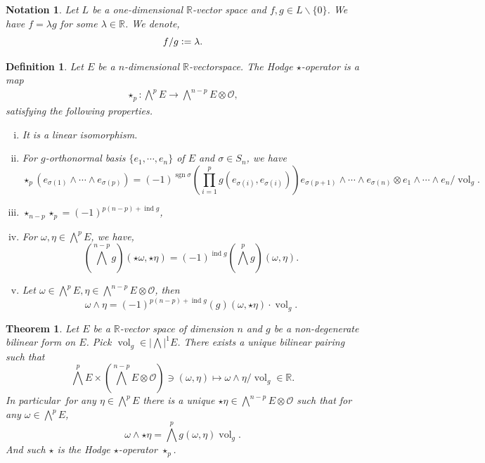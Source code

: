 \documentclass[10pt]{article}
\newtheorem{theorem}{Theorem} [section]
\newtheorem{definition}{Definition}[section]
\newtheorem{notation}{Notation}[section]
\DeclareMathOperator{\ind}{ind}
\DeclareMathOperator{\sgn}{sgn}
\DeclareMathOperator{\vol}{vol}
\newcommand{\defeq}{\vcentcolon=}
\newcommand{\R}[0]{\mathbb{R}}
\begin{document}
\begin{notation}
  Let $L$ be a one-dimensional $\R$-vector space and $f,g\in L\backslash\{0\}$. We have $f = \lambda g$ for some $\lambda\in\R$. We denote,
  \begin{equation*}
    f/g \defeq \lambda.
  \end{equation*}
\end{notation}

\begin{definition}
  Let $E$ be a $n$-dimensional $\R$-vectorspace. The Hodge $\star$-operator is a map 
  \begin{align*}
    \star_p:\bigwedge^p E\to\bigwedge^{n-p}E\otimes \mathcal{O},
  \end{align*}
  satisfying the following properties.
  \begin{enumerate}[i).]
    \item It is a linear isomorphism.
    \item For $g$-orthonormal basis $\{e_1,\cdots,e_n\}$ of $E$ and $\sigma\in S_n$, we have 
    \begin{equation*}
      \star_p (e_{\sigma(1)}\wedge\cdots\wedge e_{\sigma(p)}) = (-1)^{\sgn\sigma}\left(\prod_{i=1}^pg(e_{\sigma(i)},e_{\sigma(i)})\right)e_{\sigma(p+1)}\wedge\cdots\wedge e_{\sigma(n)}\otimes e_1\wedge\cdots\wedge e_n/\vol_g.
    \end{equation*}
    \item $\star_{n-p}\star_p = (-1)^{p(n-p)+\ind g}$,
    \item For $\omega,\eta\in\bigwedge^p E$, we have,
    \begin{equation*}
      \left(\bigwedge^{n-p}g\right)(\star\omega,\star\eta) = (-1)^{\ind g}\left(\bigwedge^p g\right)(\omega,\eta).
    \end{equation*}
    \item Let $\omega\in\bigwedge^pE,\eta\in\bigwedge^{n-p}E\otimes\mathcal{O}$, then 
    \begin{equation*}
      \omega\wedge\eta = (-1)^{p(n-p)+\ind g}\left(g\right)(\omega,\star\eta)\cdot\vol_g.
    \end{equation*}
  \end{enumerate}
\end{definition}

\begin{theorem}
  Let $E$ be a $\R$-vector space of dimension $n$ and $g$ be a non-degenerate bilinear form on $E$. Pick $\vol_g\in \left\vert\bigwedge\right\vert^1E$.
  There exists a unique bilinear pairing such that 
  \begin{equation*}
    \bigwedge^p E\times\left(\bigwedge^{n-p}E\otimes \mathcal{O}\right)\ni(\omega,\eta)\mapsto \omega\wedge\eta/\vol_g \in\R.
  \end{equation*}
  In particular\, for any $\eta\in\bigwedge^p E$ there is a unique $\star\eta\in\bigwedge^{n-p}E\otimes \mathcal{O}$ such that for any $\omega\in\bigwedge^pE$,
  \begin{equation*}
    \omega\wedge\star\eta = \bigwedge^pg(\omega,\eta)\vol_g.
  \end{equation*}
  And such $\star$ is the Hodge $\star$-operator $\star_p$.
\end{theorem}
\end{document}
